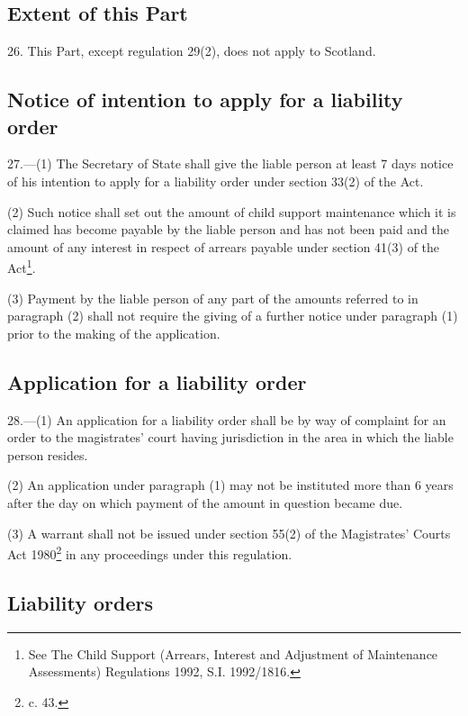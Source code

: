 \documentclass[12pt,a4paper]{article}
\begin{document}
\renewcommand\parthead{--- Part IV}

\subsection[26. Extent of this Part]{Extent of this Part}

26.  This Part, except regulation 29(2), does not apply to Scotland.

\subsection[27. Notice of intention to apply for a liability order]{Notice of intention to apply for a liability order}

27.—(1) The Secretary of State shall give the liable person at least 7 days notice of his intention to apply for a liability order under section 33(2) of the Act.

(2) Such notice shall set out the amount of child support maintenance which it is claimed has become payable by the liable person and has not been paid and the amount of any interest in respect of arrears payable under section 41(3) of the Act\footnote{\frenchspacing See The Child Support (Arrears, Interest and Adjustment of Maintenance Assessments) Regulations 1992, S.I. 1992/1816.}.

(3) Payment by the liable person of any part of the amounts referred to in paragraph (2) shall not require the giving of a further notice under paragraph (1) prior to the making of the application.

\subsection[28. Application for a liability order]{Application for a liability order}

28.—(1) An application for a liability order shall be by way of complaint for an order to the magistrates' court having jurisdiction in the area in which the liable person resides.

(2) An application under paragraph (1) may not be instituted more than 6 years after the day on which payment of the amount in question became due.

(3) A warrant shall not be issued under section 55(2) of the Magistrates' Courts Act 1980\footnote{ c. 43.} in any proceedings under this regulation.

\subsection[29. Liability orders]{Liability orders}
\end{document}
